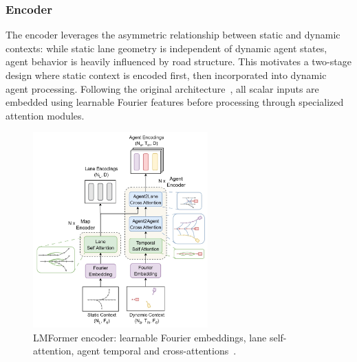\subsubsection{Encoder}
The encoder leverages the asymmetric relationship between static and dynamic contexts: while static lane geometry is independent of dynamic agent states, agent behavior is heavily influenced by road structure. This motivates a two-stage design where static context is encoded first, then incorporated into dynamic agent processing. Following the original architecture~\cite{lmformerYadav2025}, all scalar inputs are embedded using learnable Fourier features before processing through specialized attention modules.
\begin{figure}[H]
  \centering
  \includegraphics[width=0.6\textwidth]{figures/lmformer_arch_encorder.png}
  \caption{LMFormer encoder: learnable Fourier embeddings, lane self-attention, agent temporal and cross-attentions~\cite{lmformerYadav2025}.}
  \label{fig:lmformer_arch_encoder}
\end{figure}

